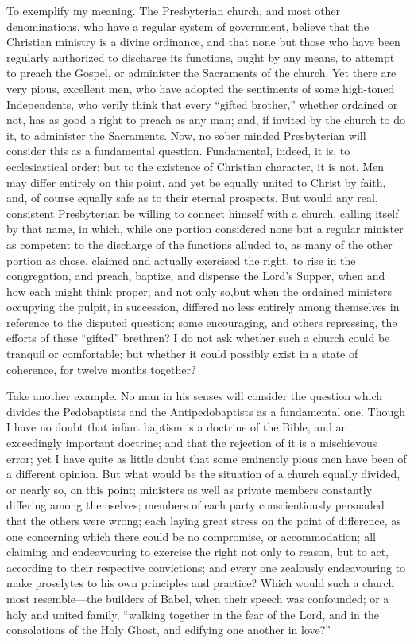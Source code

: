 \documentclass[
]{book}
\begin{document}
To exemplify my meaning. The Presbyterian church, and most other denominations, who have a regular system of government, believe that the Christian ministry is a divine ordinance, and that none but those who have been regularly authorized to discharge its functions, ought by any means, to attempt to preach the Gospel, or administer the Sacraments of the church. Yet there are very pious, excellent men, who have adopted the sentiments of some high-toned Independents, who verily think that every ``gifted brother,'' whether ordained or not, has as good a right to preach as any man; and, if invited by the church to do it, to administer the Sacraments. Now, no sober minded Presbyterian will consider this as a fundamental question. Fundamental, indeed, it is, to ecclesiastical order; but to the existence of Christian character, it is not. Men may differ entirely on this point, and yet be equally united to Christ by faith, and, of course equally safe as to their eternal prospects. But would any real, consistent Presbyterian be willing to connect himself with a church, calling itself by that name, in which, while one portion considered none but a regular minister as competent to the discharge of the functions alluded to, as many of the other portion as chose, claimed and actually exercised the right, to rise in the congregation, and preach, baptize, and dispense the Lord's Supper, when and how each might think proper; and not only so,but when the ordained ministers occupying the pulpit, in succession, differed no less entirely among themselves in reference to the disputed question; some encouraging, and others repressing, the efforts of these ``gifted'' brethren? I do not ask whether such a church could be tranquil or comfortable; but whether it could possibly exist in a state of coherence, for twelve months together?

Take another example. No man in his senses will consider the question which divides the Pedobaptists and the Antipedobaptists as a fundamental one. Though I have no doubt that infant baptism is a doctrine of the Bible, and an exceedingly important doctrine; and that the rejection of it is a mischievous error; yet I have quite as little doubt that some eminently pious men have been of a different opinion. But what would be the situation of a church equally divided, or nearly so, on this point; ministers as well as private members constantly differing among themselves; members of each party conscientiously persuaded that the others were wrong; each laying great stress on the point of difference, as one concerning which there could be no compromise, or accommodation; all claiming and endeavouring to exercise the right not only to reason, but to act, according to their respective convictions; and every one zealously endeavouring to make proselytes to his own principles and practice? Which would such a church most resemble---the builders of Babel, when their speech was confounded; or a holy and united family, ``walking together in the fear of the Lord, and in the consolations of the Holy Ghost, and edifying one another in love?''
\end{document}
